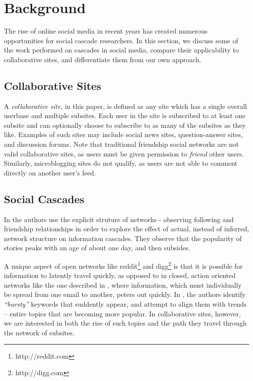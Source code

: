 \documentclass{article} %
\begin{document}
\section{Background}
\label{sec:background}
The rise of online social media in recent years has created numerous opportunities for social cascade researchers. In this section, we discuss some of the work performed on cascades in social media, compare their applicability to collaborative sites, and differentiate them from our own approach.

\subsection{Collaborative Sites}
A \textit{collaborative site}, in this paper, is defined as any site which has a single overall userbase and multiple subsites. Each user in the site is subscribed to at least one subsite and can optionally choose to subscribe to as many of the subsites as they like. Examples of such sites may include social news sites, question-answer sites, and discussion forums. Note that traditional friendship social networks are not valid collaborative sites, as users must be given permission to \textit{friend} other users. Similarly, microblogging sites do not qualify, as users are not able to comment directly on another user's feed.

\subsection{Social Cascades}
In \cite{info_contag} the authors use the explicit struture of networks - observing following and friendship relationships in order to explore the effect of actual, instead of inferred, network structure on information cascades. They observe that the popularity of stories peaks with an age of about one day, and then subsides. 

A unique aspect of open networks like reddit\footnote{http://reddit.com} and digg\footnote{http://digg.com} is that it is possible for information to latently travel quickly, as opposed to in closed, action oriented networks like the one described in \cite{viral_dynamics}, where information, which must individually be spread from one email to another, peters out quickly. In \cite{twitter_trend}, the authors identify \textit{``bursty''} keywords that suddently appear, and attempt to align them with trends -- entire topics that are becoming more popular. In collaborative sites, however, we are interested in both the rise of such topics and the path they travel through the network of subsites.
\end{document}
